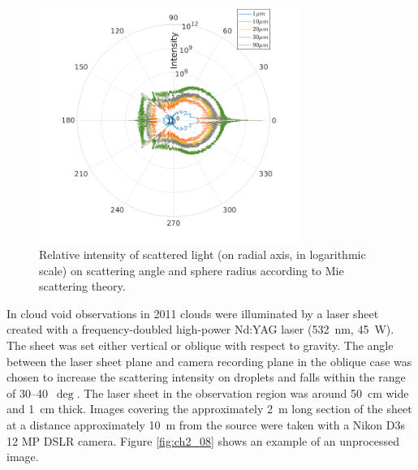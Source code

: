 \documentclass[../main.tex]{subfiles}
\begin{document}
\begin{figure}
\centering
\noindent \includegraphics[width=20pc]{gfx/I_vs_angle_multiple.png}
\caption{Relative intensity of scattered light (on radial axis, in logarithmic scale) on scattering angle and sphere radius according to Mie scattering theory.}
\label{fig:ch2_07}
\end{figure}

In cloud void observations in 2011 clouds were illuminated by a laser sheet created with a frequency-doubled high-power Nd:YAG laser (532~nm, 45~W). The sheet was set either vertical or oblique with respect to gravity. The angle between the laser sheet plane and camera recording plane in the oblique case was chosen to increase the scattering intensity on droplets and falls within the range of 30–40~$\deg$. The laser sheet in the observation region was around 50~cm wide and 1~cm thick. Images covering the approximately 2~m long section of the sheet at a distance approximately 10~m from the source were taken with a Nikon D3s 12 MP DSLR camera. Figure \ref{fig:ch2_08} shows an example of an unprocessed image.
\end{document}

